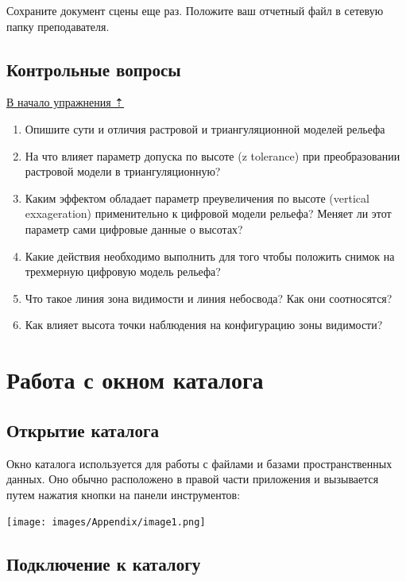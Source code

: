\documentclass[12pt,]{book}
\begin{document}
Сохраните документ сцены еще раз. Положите ваш отчетный файл в сетевую папку преподавателя.

\hypertarget{threed-modelling-questions}{%
\section{Контрольные вопросы}\label{threed-modelling-questions}}

\protect\hyperlink{threed-modelling}{В начало упражнения ⇡}

\begin{enumerate}
\def\labelenumi{\arabic{enumi}.}
\item
  Опишите сути и отличия растровой и триангуляционной моделей рельефа
\item
  На что влияет параметр допуска по высоте (z tolerance) при преобразовании растровой модели в триангуляционную?
\item
  Каким эффектом обладает параметр преувеличения по высоте (vertical exxageration) применительно к цифровой модели рельефа? Меняет ли этот параметр сами цифровые данные о высотах?
\item
  Какие действия необходимо выполнить для того чтобы положить снимок на трехмерную цифровую модель рельефа?
\item
  Что такое линия зона видимости и линия небосвода? Как они соотносятся?
\item
  Как влияет высота точки наблюдения на конфигурацию зоны видимости?
\end{enumerate}

\hypertarget{appendix--}{%
\appendix}


\hypertarget{manual-catalog}{%
\chapter{Работа с окном каталога}\label{manual-catalog}}

\hypertarget{section-5}{%
\section{Открытие каталога}\label{section-5}}

Окно каталога используется для работы с файлами и базами пространственных данных. Оно обычно расположено в правой части приложения и вызывается путем нажатия кнопки на панели инструментов:

\texttt{[image: images/Appendix/image1.png]}

\hypertarget{section-6}{%
\section{Подключение к каталогу}\label{section-6}}
\end{document}
